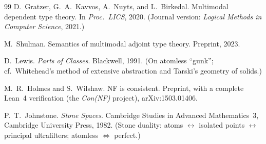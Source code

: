 \documentclass[]{article}
\theoremstyle{definition}
\theoremstyle{remark}
\begin{document}
\begin{thebibliography}{99}
 D.~Gratzer, G.~A.~Kavvos, A.~Nuyts, and L.~Birkedal.
Multimodal dependent type theory. In \emph{Proc.\ LICS}, 2020. (Journal version:
\emph{Logical Methods in Computer Science}, 2021.)

 M.~Shulman. Semantics of multimodal adjoint type theory.
Preprint, 2023.

 D.~Lewis. \emph{Parts of Classes}. Blackwell, 1991. (On
atomless ``gunk''; cf.\ Whitehead's method of extensive abstraction and Tarski's
geometry of solids.)

 M.~R.~Holmes and S.~Wilshaw. NF is consistent.
Preprint, with a complete Lean~4 verification (the \emph{Con(NF)} project),
arXiv:1503.01406.

 P.~T.~Johnstone. \emph{Stone Spaces}. Cambridge Studies in
Advanced Mathematics~3, Cambridge University Press, 1982. (Stone duality: atoms
$\leftrightarrow$ isolated points $\leftrightarrow$ principal ultrafilters; atomless
$\Leftrightarrow$ perfect.)

\end{thebibliography}
\end{document}
